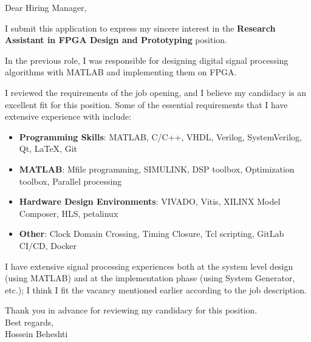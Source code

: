 \documentclass[localFont]{awesome-source-cv} %
\begin{document}
\makecvheader


\bigskip %
{\selectfont 
Dear Hiring Manager,

\bigskip 

I submit this application to express my sincere interest in the \textbf{Research Assistant in FPGA Design and Prototyping} position.

In the previous role, I was responsible for designing digital signal processing algorithms with MATLAB and implementing them on FPGA.

I reviewed the requirements of the job opening, and I believe my candidacy is an excellent fit for this position. Some of the essential requirements that I have extensive experience with include:

\begin{itemize}
	\item \textbf{Programming Skills}:
	      MATLAB, C/C++, VHDL, Verilog, SystemVerilog, Qt, \LaTeX, Git
	\item \textbf{MATLAB}:
	      Mfile programming, SIMULINK, DSP toolbox, Optimization toolbox, Parallel processing
	\item \textbf{Hardware Design Environments}:
	      VIVADO, Vitis, XILINX Model Composer, HLS, petalinux
	\item \textbf{Other}:
	      Clock Domain Crossing, Timing Closure, Tcl scripting, GitLab CI/CD, Docker
\end{itemize}

I have extensive signal processing experiences both at the system level design (using MATLAB) and at the implementation phase (using System Generator, etc.); I think I fit the vacancy mentioned earlier according to the job description.

Thank you in advance for reviewing my candidacy for this position.\\
\bigskip 
Best regards,\\
\bigskip 
Hossein Beheshti\\
}
\end{document}
